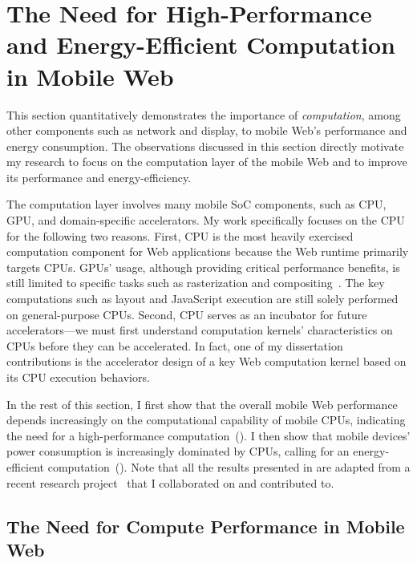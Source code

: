 
\chapter{The Need for High-Performance and Energy-Efficient Computation in Mobile Web}
\label{sec:motivation}

This section quantitatively demonstrates the importance of \textit{computation}, among other components such as network and display, to mobile Web's performance and energy consumption. The observations discussed in this section directly motivate my research to focus on the computation layer of the mobile Web and to improve its performance and energy-efficiency.

The computation layer involves many mobile SoC components, such as CPU, GPU, and domain-specific accelerators. My work specifically focuses on the CPU for the following two reasons. First, CPU is the most heavily exercised computation component for Web applications because the Web runtime primarily targets CPUs. GPUs' usage, although providing critical performance benefits, is still limited to specific tasks such as rasterization and compositing~\cite{gpucompositor}. The key computations such as layout and JavaScript execution are still solely performed on general-purpose CPUs. Second, CPU serves as an incubator for future accelerators---we must first understand computation kernels' characteristics on CPUs before they can be accelerated. In fact, one of my dissertation contributions is the accelerator design of a key Web computation kernel based on its CPU execution behaviors.

In the rest of this section, I first show that the overall mobile Web performance depends increasingly on the computational capability of mobile CPUs, indicating the need for a high-performance computation~(). I then show that mobile devices' power consumption is increasingly dominated by CPUs, calling for an energy-efficient computation~(). Note that all the results presented in  are adapted from a recent research project~\cite{mobilecpu} that I collaborated on and contributed to.

\section{The Need for Compute Performance in Mobile Web}
\label{sec:motivation:perf}

